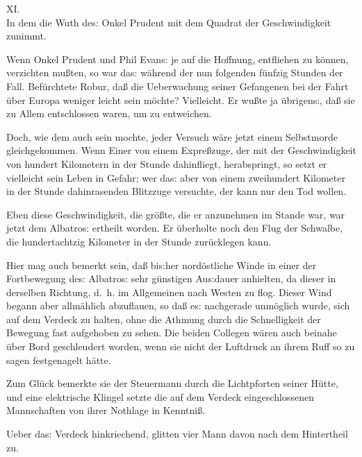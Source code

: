 \documentclass[oneside,12pt]{book}
\newenvironment{antiqua}{\normalfont}{}
\newcommand{\s}{s:}
\begin{document}
\newpage\begin{center}\label{kap11}
{\large \begin{antiqua}XI.\end{antiqua}\\
In dem die Wuth de{\s} Onkel Prudent mit dem Quadrat der
Geschwindigkeit zunimmt.\\\bigskip}
\end{center}



Wenn Onkel Prudent und Phil Evan{\s} je auf die Hoffnung, entfliehen
zu k\"onnen, verzichten mu{\ss}ten, so war da{\s} w\"ahrend der nun
folgenden f\"unfzig Stunden der Fall. Bef\"urchtete Robur, da{\ss}
die Ueberwachung seiner Gefangenen bei der Fahrt \"uber Europa
weniger leicht sein m\"ochte? Vielleicht. Er wu{\ss}te ja
\"ubrigen{\s}, da{\ss} sie zu Allem entschlossen waren, um zu
entweichen.

Doch, wie dem auch sein mochte, jeder Versuch w\"are jetzt einem
Selbstmorde gleichgekommen. Wenn Einer von einem Expre{\ss}zuge, der
mit der Geschwindigkeit von hundert Kilometern in der Stunde
dahinfliegt, herabspringt, so setzt er vielleicht sein Leben in
Gefahr; wer da{\s} aber von einem zweihundert Kilometer in der Stunde
dahinrasenden Blitzzuge versuchte, der kann nur den Tod wollen.

Eben diese Geschwindigkeit, die gr\"o{\ss}te, die er anzunehmen im
Stande war, war jetzt dem {\glqq}Albatro{\s}{\grqq} ertheilt worden.
Er \"uberholte noch den Flug der Schwalbe, die hundertacht\/zig
Kilometer in der Stunde zur\"ucklegen kann.

Hier mag auch bemerkt sein, da{\ss} bi{\s}her nord\"ostliche Winde in
einer der Fortbewegung de{\s} {\glqq}Albatro{\s}{\grqq} sehr
g\"unstigen Au{\s}dauer anhielten, da dieser in derselben Richtung,
d.~h. im Allgemeinen nach Westen zu flog. Dieser Wind begann aber
allm\"ahlich abzuflauen, so da{\ss} e{\s} nachgerade unm\"oglich
wurde, sich auf dem Verdeck zu halten, ohne die Athmung durch die
Schnelligkeit der Bewegung fast aufgehoben zu sehen. Die beiden
Collegen w\"aren auch beinahe \"uber Bord geschleudert worden, wenn
sie nicht der Luftdruck an ihrem Ruff so zu sagen festgenagelt
h\"atte.

Zum Gl\"uck bemerkte sie der Steuermann durch die Lichtpforten seiner
H\"utte, und eine elektrische Klingel setzte die auf dem Verdeck
eingeschlossenen Mannschaften von ihrer Nothlage in Kenntni{\ss}.

Ueber da{\s} Verdeck hinkriechend, glitten vier Mann davon nach dem
Hintertheil zu.
\end{document}
